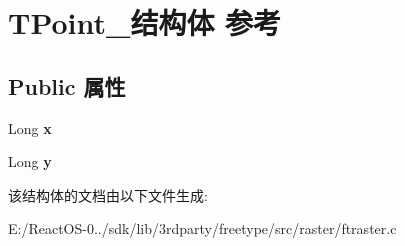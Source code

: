 \hypertarget{struct_t_point__}{}\section{T\+Point\+\_\+结构体 参考}
\label{struct_t_point__}
\subsection*{Public 属性}
\begin{DoxyCompactItemize}
\item 
\mbox{\label{struct_t_point___ad454f4acc4325ab64bd3f9763226f4c7}} 
Long {\bfseries x}
\item 
\mbox{\label{struct_t_point___a3baa22682a2412867ee411b5528f9086}} 
Long {\bfseries y}
\end{DoxyCompactItemize}


该结构体的文档由以下文件生成\+:\begin{DoxyCompactItemize}
\item 
E\+:/\+React\+O\+S-\/0../sdk/lib/3rdparty/freetype/src/raster/ftraster.\+c\end{DoxyCompactItemize}

